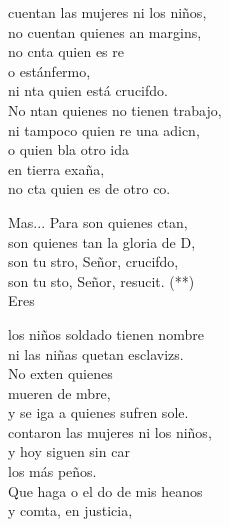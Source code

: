 \begin{cancion}%
	cuentan las mujeres ni los niños,\\
	no cuentan quienes an margins,\\
	no cnta quien es re \\
	o estánfermo,\\
	ni nta quien está crucifdo.\\
	\jump
	No ntan quienes no tienen trabajo,\\
	ni tampoco quien re una adicn,\\
	o quien bla otro ida \\
	en tierra exaña,\\
	no cta quien es de otro co.\jump\\
	\begin{chorus}%
		Mas... Para  son quienes ctan,\\
		son quienes tan la gloria de D,\\
		son tu stro, Señor, crucifdo,\\
		son tu sto, Señor, resucit. (**)\\
		Eres \jump\\
	\end{chorus}%
	los niños soldado tienen nombre\\
	ni las niñas quetan esclavizs.\\
	No exten quienes \\
	 mueren de mbre,\\
	y se iga a quienes sufren sole.\\
	\jump
	contaron las mujeres ni los niños,\\
	y hoy siguen sin car \\
	los más peños.\\
	Que haga o el do de mis heanos\\
	y comta, en justicia, \\

\end{cancion}
